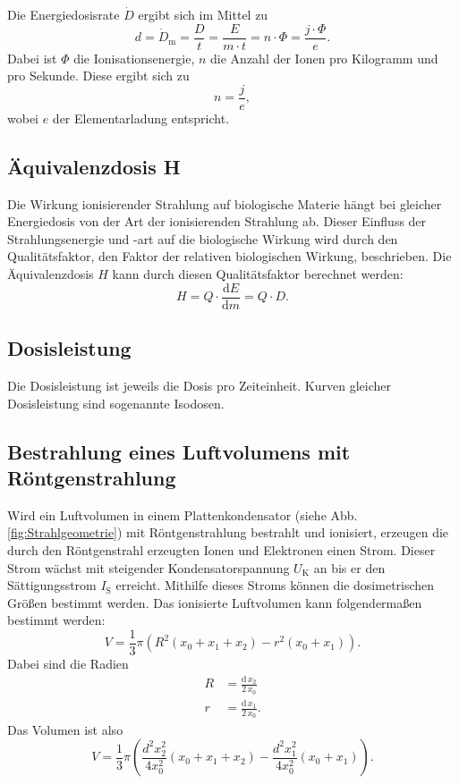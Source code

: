 \noindent Die Energiedosisrate $\dot{D}$ ergibt sich im Mittel zu 
\begin{equation}
    d = \dot{D}_\text{m} = \frac{D}{t} =\frac{E}{m \cdot t} = n \cdot \Phi = \frac{j \cdot \Phi}{e}.
    \label{eqn:Energiedosisrate}
\end{equation}
Dabei ist $\Phi$ die Ionisationsenergie, $n$ die Anzahl der Ionen pro Kilogramm und pro Sekunde. 
Diese ergibt sich zu
\begin{equation*}
    n = \frac{j}{e},
    \label{eqn:Ionenanzahl}
\end{equation*}
wobei $e$ der Elementarladung entspricht. 

\subsection{Äquivalenzdosis H}
Die Wirkung ionisierender Strahlung auf biologische Materie
hängt bei gleicher Energiedosis von der Art der ionisierenden
Strahlung ab. Dieser Einfluss der Strahlungsenergie und -art
auf die biologische Wirkung wird durch den Qualitätsfaktor,
den Faktor der relativen biologischen Wirkung,
beschrieben.
Die Äquivalenzdosis $H$ kann durch diesen Qualitätsfaktor
berechnet werden:
\begin{equation*}
    H = Q \cdot \frac{\text{d}E}{\text{d}m} = Q \cdot D.
    \label{eqn:Aequivalenzdosis}
\end{equation*}

\subsection{Dosisleistung}
Die Dosisleistung ist jeweils die Dosis pro Zeiteinheit.
Kurven gleicher Dosisleistung sind sogenannte Isodosen.

\subsection{Bestrahlung eines Luftvolumens mit Röntgenstrahlung}
Wird ein Luftvolumen in einem Plattenkondensator
(siehe Abb. \ref{fig:Strahlgeometrie}) mit
Röntgenstrahlung bestrahlt und ionisiert, erzeugen die durch
den Röntgenstrahl erzeugten Ionen und Elektronen einen Strom.
Dieser Strom wächst mit steigender Kondensatorspannung 
$U_\text{K}$ an bis er den Sättigungsstrom $I_\text{S}$
erreicht. Mithilfe dieses Stroms können die dosimetrischen
Größen bestimmt werden.
\newline
Das ionisierte Luftvolumen kann folgendermaßen bestimmt werden:
\begin{equation*}
    V = \frac{1}{3} \pi (R^2 (x_0 + x_1 + x_2) - r^2 (x_0 + x_1)). 
\end{equation*}
Dabei sind die Radien
\begin{align*}
    R &= \frac{\text{d} \, x_2}{2 \, x_0} \\
    r &= \frac{\text{d} \, x_1}{2 \, x_0}. 
\end{align*}
Das Volumen ist also 
\begin{equation}
    V = \frac{1}{3} \pi \left(\frac{d^2 x_2^2}{4 x_0^2}(x_0 + x_1 + x_2) - \frac{d^2 x_1^2}{4 x_0^2}(x_0 + x_1)\right).
    \label{eqn:V}
\end{equation}

